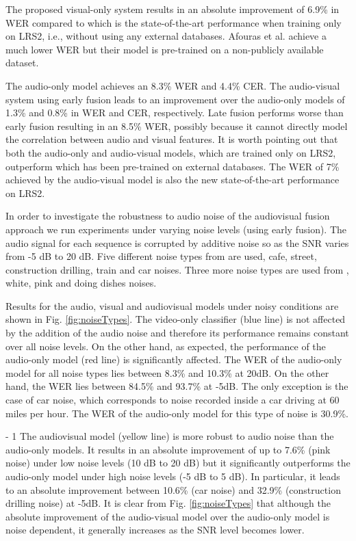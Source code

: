 \documentclass{article}
\begin{document}
The proposed visual-only system results in an absolute improvement of 6.9\% in WER compared to \cite{Chung17cvpr} which is the state-of-the-art performance when training only on LRS2, i.e., without using any external databases. Afouras et al. \cite{afouras2018deep} achieve a much lower WER but their model is pre-trained on a non-publicly available dataset.

The audio-only model achieves an 8.3\% WER and 4.4\% CER. The audio-visual system using early fusion leads to an improvement over the audio-only models of 1.3\% and 0.8\% in WER and CER, respectively. Late fusion performs worse than early fusion resulting in an 8.5\% WER, possibly because it cannot directly model the correlation between audio and visual features. It is worth pointing out that both the audio-only and audio-visual models, which are trained only on LRS2, outperform \cite{afouras2018deep} which has been pre-trained on external databases. The WER of 7\% achieved by the audio-visual model is also the new state-of-the-art performance on LRS2.


In order to investigate the robustness to audio noise of the
audiovisual fusion approach we run experiments under
varying noise levels (using early fusion). The audio signal for each sequence
is corrupted by additive  noise so as the SNR varies from -5 dB to 20 dB. Five different noise types from \cite{loizou2007speech} are used, cafe, street, construction drilling, train and car noises. Three more noise types are used from \cite{speechcommands}, white, pink and doing dishes noises.


Results for the audio, visual and audiovisual models under noisy conditions are shown in Fig.  \ref{fig:noiseTypes}. The
video-only classifier (blue line)
is not affected by the addition of the audio noise and
therefore its performance remains constant over all noise
levels. On the other hand, as expected, the performance
of the audio-only model (red  line) is significantly affected. 
The WER of the audio-only model for all noise types lies between 8.3\% and 10.3\% at 20dB. On the other hand, the WER lies between 84.5\% and 93.7\% at -5dB. The only exception is the case of car noise, which corresponds to noise recorded inside a car driving at 60 miles per hour. The WER of the audio-only model for this type of noise is 30.9\%.

\looseness - 1
The audiovisual model (yellow line) 
is more robust to audio noise than the audio-only models. It results in an absolute improvement of up to 7.6\% (pink noise) under low noise levels (10 dB to 20 dB) but it significantly outperforms the audio-only model under high noise levels (-5 dB to 5 dB). In particular, it leads to an absolute improvement between 10.6\% (car noise) and 32.9\% (construction drilling noise) at -5dB. It is clear from Fig. \ref{fig:noiseTypes} that although the absolute improvement of the audio-visual model over the audio-only model is noise dependent, it generally increases as the SNR level becomes lower.   
\end{document}
